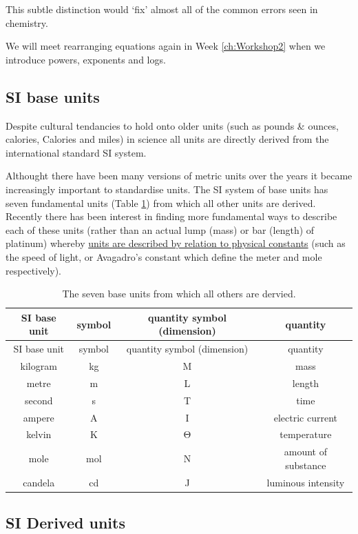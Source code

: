 \documentclass[
]{book}
\begin{document}
This subtle distinction would `fix' almost all of the common errors seen in chemistry.

We will meet rearranging equations again in Week \ref{ch:Workshop2} when we introduce powers, exponents and logs.

\hypertarget{si-base-units}{%
\subsection{SI base units}\label{si-base-units}}

Despite cultural tendancies to hold onto older units (such as pounds \& ounces, calories, Calories and miles) in science all units are directly derived from the international standard SI system.

Althought there have been many versions of metric units over the years it became increasingly important to standardise units. The SI system of base units has seven fundamental units (Table \ref{tab:SIbase}) from which all other units are derived. Recently there has been interest in finding more fundamental ways to describe each of these units (rather than an actual lump (mass) or bar (length) of platinum) whereby \href{https://www.npl.co.uk/si-units/the-redefinition-of-the-si-units}{units are described by relation to physical constants} (such as the speed of light, or Avagadro's constant which define the meter and mole respectively).

\begin{longtable}[]{@{}cccc@{}}
\caption{\label{tab:SIbase} The seven base units from which all others are dervied.}\tabularnewline
\toprule
SI base unit & symbol & quantity symbol (dimension) & quantity \\
\midrule
\endfirsthead
\toprule
SI base unit & symbol & quantity symbol (dimension) & quantity \\
\midrule
\endhead
kilogram & kg & M & mass \\
metre & m & L & length \\
second & s & T & time \\
ampere & A & I & electric current \\
kelvin & K & Θ & temperature \\
mole & mol & N & amount of substance \\
candela & cd & J & luminous intensity \\
\bottomrule
\end{longtable}

\hypertarget{si-derived-units}{%
\subsection{SI Derived units}\label{si-derived-units}}
\end{document}
